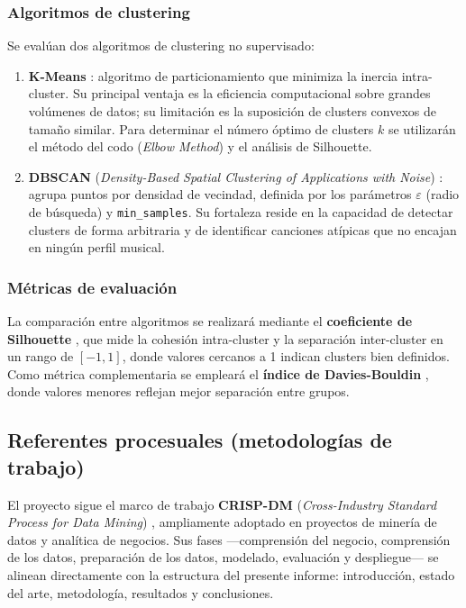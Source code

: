 \subsubsection{Algoritmos de clustering}

Se evalúan dos algoritmos de clustering no supervisado:

\begin{enumerate}
    \item \textbf{K-Means} \cite{macqueen1967some}: algoritmo de particionamiento que minimiza la inercia intra-cluster. Su principal ventaja es la eficiencia computacional sobre grandes volúmenes de datos; su limitación es la suposición de clusters convexos de tamaño similar. Para determinar el número óptimo de clusters $k$ se utilizarán el método del codo (\textit{Elbow Method}) y el análisis de Silhouette.
    \item \textbf{DBSCAN} (\textit{Density-Based Spatial Clustering of Applications with Noise}) \cite{ester1996density}: agrupa puntos por densidad de vecindad, definida por los parámetros $\varepsilon$ (radio de búsqueda) y \texttt{min\_samples}. Su fortaleza reside en la capacidad de detectar clusters de forma arbitraria y de identificar canciones atípicas que no encajan en ningún perfil musical.
\end{enumerate}

\subsubsection{Métricas de evaluación}

La comparación entre algoritmos se realizará mediante el \textbf{coeficiente de Silhouette} \cite{rousseeuw1987silhouettes}, que mide la cohesión intra-cluster y la separación inter-cluster en un rango de $[-1, 1]$, donde valores cercanos a 1 indican clusters bien definidos. Como métrica complementaria se empleará el \textbf{índice de Davies-Bouldin} \cite{davies1979cluster}, donde valores menores reflejan mejor separación entre grupos.

\subsection{Referentes procesuales (metodologías de trabajo)}

El proyecto sigue el marco de trabajo \textbf{CRISP-DM} (\textit{Cross-Industry Standard Process for Data Mining}) \cite{wirth2000crisp}, ampliamente adoptado en proyectos de minería de datos y analítica de negocios. Sus fases ---comprensión del negocio, comprensión de los datos, preparación de los datos, modelado, evaluación y despliegue--- se alinean directamente con la estructura del presente informe: introducción, estado del arte, metodología, resultados y conclusiones.

